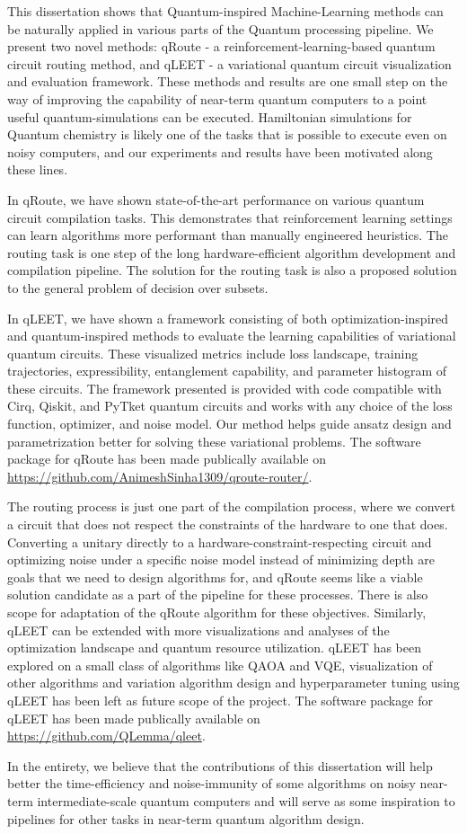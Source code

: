 This dissertation shows that Quantum-inspired Machine-Learning methods can be naturally applied in various parts of the Quantum processing pipeline. We present two novel methods: qRoute - a reinforcement-learning-based quantum circuit routing method, and qLEET - a variational quantum circuit visualization and evaluation framework. These methods and results are one small step on the way of improving the capability of near-term quantum computers to a point useful quantum-simulations can be executed. Hamiltonian simulations for Quantum chemistry is likely one of the tasks that is possible to execute even on noisy computers, and our experiments and results have been motivated along these lines.

In qRoute, we have shown state-of-the-art performance on various quantum circuit compilation tasks. This demonstrates that reinforcement learning settings can learn algorithms more performant than manually engineered heuristics. The routing task is one step of the long hardware-efficient algorithm development and compilation pipeline. The solution for the routing task is also a proposed solution to the general problem of decision over subsets.

In qLEET, we have shown a framework consisting of both optimization-inspired and quantum-inspired methods to evaluate the learning capabilities of variational quantum circuits. These visualized metrics include loss landscape, training trajectories, expressibility, entanglement capability, and parameter histogram of these circuits. The framework presented is provided with code compatible with Cirq, Qiskit, and PyTket quantum circuits and works with any choice of the loss function, optimizer, and noise model. Our method helps guide ansatz design and parametrization better for solving these variational problems.
The software package for qRoute has been made publically available on \url{https://github.com/AnimeshSinha1309/qroute-router/}.

The routing process is just one part of the compilation process, where we convert a circuit that does not respect the constraints of the hardware to one that does. Converting a unitary directly to a hardware-constraint-respecting circuit and optimizing noise under a specific noise model instead of minimizing depth are goals that we need to design algorithms for, and qRoute seems like a viable solution candidate as a part of the pipeline for these processes. There is also scope for adaptation of the qRoute algorithm for these objectives. Similarly, qLEET can be extended with more visualizations and analyses of the optimization landscape and quantum resource utilization. qLEET has been explored on a small class of algorithms like QAOA and VQE, visualization of other algorithms and variation algorithm design and hyperparameter tuning using qLEET has been left as future scope of the project. 
The software package for qLEET has been made publically available on \url{https://github.com/QLemma/qleet}.

In the entirety, we believe that the contributions of this dissertation will help better the time-efficiency and noise-immunity of some algorithms on noisy near-term intermediate-scale quantum computers and will serve as some inspiration to pipelines for other tasks in near-term quantum algorithm design.
